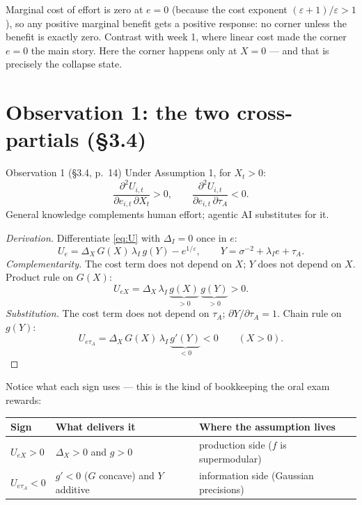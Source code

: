 \documentclass[11pt,a4paper]{article}
\theoremstyle{definition}
\theoremstyle{remark}
\newcommand{\tA}{\tau_A}
\newcommand{\lI}{\lambda_I}
\begin{document}
\begin{intuition}
Marginal cost of effort is zero at $e=0$ (because the cost exponent $(\varepsilon+1)/\varepsilon>1$), so any
positive marginal benefit gets a positive response: no corner unless the benefit is exactly zero.
Contrast with week 1, where linear cost made the corner $e=0$ the main story. Here the corner happens only
at $X=0$ --- and that is precisely the collapse state.
\end{intuition}

\section{Observation 1: the two cross-partials (\S3.4)}

\begin{paperbox}{Observation 1 (\S3.4, p.~14)}
Under Assumption 1, for $X_t>0$:
\[
\frac{\partial^2U_{i,t}}{\partial e_{i,t}\,\partial X_t}>0,\qquad
\frac{\partial^2U_{i,t}}{\partial e_{i,t}\,\partial\tA}<0.
\]
General knowledge complements human effort; agentic AI substitutes for it.
\end{paperbox}

\begin{proof}[Derivation]
Differentiate \eqref{eq:U} with $\Delta_I=0$ once in $e$:
\[
U_e=\Delta_X\,G(X)\,\lI\,g(Y)-e^{1/\varepsilon},\qquad Y=\sigma^{-2}+\lI e+\tA .
\]
\emph{Complementarity.} The cost term does not depend on $X$; $Y$ does not depend on $X$. Product rule on
$G(X)$:
\[
U_{eX}=\Delta_X\,\lI\,\underbrace{g(X)}_{>0}\,\underbrace{g(Y)}_{>0}>0 .
\]
\emph{Substitution.} The cost term does not depend on $\tA$; $\partial Y/\partial\tA=1$. Chain rule on
$g(Y)$:
\[
U_{e\tA}=\Delta_X\,G(X)\,\lI\,\underbrace{g'(Y)}_{<0}<0\qquad(X>0).
\]
\end{proof}

\noindent Notice what each sign uses --- this is the kind of bookkeeping the oral exam rewards:
\begin{center}
\begin{tabular}{@{}lll@{}}
\toprule
Sign & What delivers it & Where the assumption lives\\
\midrule
$U_{eX}>0$ & $\Delta_X>0$ and $g>0$ & production side ($f$ is supermodular)\\
$U_{e\tA}<0$ & $g'<0$ ($G$ concave) and $Y$ additive & information side (Gaussian precisions)\\
\bottomrule
\end{tabular}
\end{center}
\end{document}
